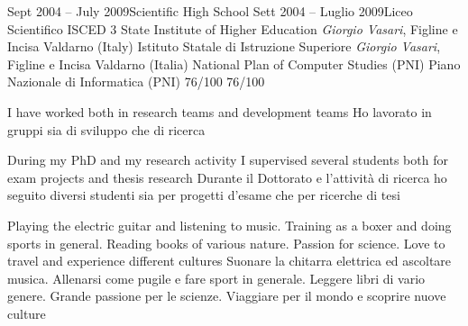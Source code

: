 \begin{europasscv}
      \school
      {Sept 2004 -- July 2009}{Scientific High School}
      {Sett 2004 -- Luglio 2009}{Liceo Scientifico}
      {ISCED 3}
        \schoolLocation
          {State Institute of Higher Education \textit{Giorgio Vasari}, Figline e Incisa Valdarno (Italy)}
          {Istituto Statale di Istruzione Superiore \textit{Giorgio Vasari}, Figline e Incisa Valdarno (Italia)}
        \schoolFaculty
          {National Plan of Computer Studies (PNI)}
          {Piano Nazionale di Informatica (PNI)}
        \addFinalRank
          {76/100}
          {76/100}
    
    \personalSkills
    
      
      \communicationSkills
        {I have worked both in research teams and development teams}
        {Ho lavorato in gruppi sia di sviluppo che di ricerca}
      
      \organisationalSkills
        {During my PhD and my research activity I supervised several students both for exam projects and thesis research}
        {Durante il Dottorato e l'attività di ricerca ho seguito diversi studenti sia per progetti d'esame che per ricerche di tesi}
        
      \computerSkills
        {}
        {}
        
      \otherSkills
        {Playing the electric guitar and listening to music. Training as a boxer and doing sports in general. Reading books of various nature. Passion for science. Love to travel and experience different cultures}
        {Suonare la chitarra elettrica ed ascoltare musica. Allenarsi come pugile e fare sport in generale. Leggere libri di vario genere. Grande passione per le scienze. Viaggiare per il mondo e scoprire nuove culture}
        

\end{europasscv}
